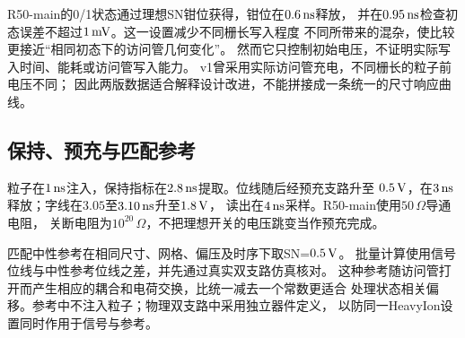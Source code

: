 R50-main的0/1状态通过理想SN钳位获得，钳位在$0.6\,\mathrm{ns}$释放，
并在$0.95\,\mathrm{ns}$检查初态误差不超过$1\,\mathrm{mV}$。这一设置减少不同栅长写入程度
不同所带来的混杂，使比较更接近“相同初态下的访问管几何变化”。
然而它只控制初始电压，不证明实际写入时间、能耗或访问管写入能力。
v1曾采用实际访问管充电，不同栅长的粒子前电压不同；
因此两版数据适合解释设计改进，不能拼接成一条统一的尺寸响应曲线。

\subsection{保持、预充与匹配参考}
粒子在$1\,\mathrm{ns}$注入，保持指标在$2.8\,\mathrm{ns}$提取。位线随后经预充支路升至
$0.5\,\mathrm{V}$，在$3\,\mathrm{ns}$释放；字线在$3.05$至$3.10\,\mathrm{ns}$升至$1.8\,\mathrm{V}$，
读出在$4\,\mathrm{ns}$采样。R50-main使用$50\,\Omega$导通电阻，
关断电阻为$10^{20}\,\Omega$，不把理想开关的电压跳变当作预充完成。

匹配中性参考在相同尺寸、网格、偏压及时序下取SN=$0.5\,\mathrm{V}$。
批量计算使用信号位线与中性参考位线之差，并先通过真实双支路仿真核对。
这种参考随访问管打开而产生相应的耦合和电荷交换，比统一减去一个常数更适合
处理状态相关偏移。参考中不注入粒子；物理双支路中采用独立器件定义，
以防同一HeavyIon设置同时作用于信号与参考。
